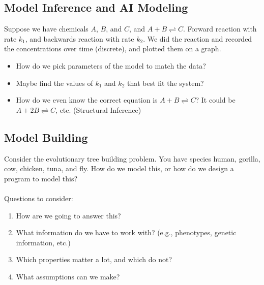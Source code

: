 \documentclass[10pt]{article}
\begin{document}
\subsection*{Model Inference and AI Modeling}
Suppose we have chemicals $A$, $B$, and $C$, and $A + B \rightleftharpoons C$.  Forward reaction with rate $k_1$, and backwards reaction with rate $k_2$.  We did the reaction and recorded the concentrations over time (discrete), and plotted them on a graph.
\begin{itemize}
	\item How do we pick parameters of the model to match the data?
	\item Maybe find the values of $k_1$ and $k_2$ that best fit the system?
	\item How do we even know the correct equation is $A + B \rightleftharpoons C$?  It could be $A + 2B \rightleftharpoons C$, etc.  (Structural Inference)
\end{itemize}

\subsection*{Model Building}
Consider the evolutionary tree building problem.  You have species human, gorilla, cow, chicken, tuna, and fly.  How do we model this, or how do we design a program to model this?\\\\
Questions to consider:
\begin{enumerate}
	\item How are we going to answer this?
	\item What information do we have to work with?  (e.g., phenotypes, genetic information, etc.)
	\item Which properties matter a lot, and which do not?
	\item What assumptions can we make?
\end{enumerate}
\end{document}
